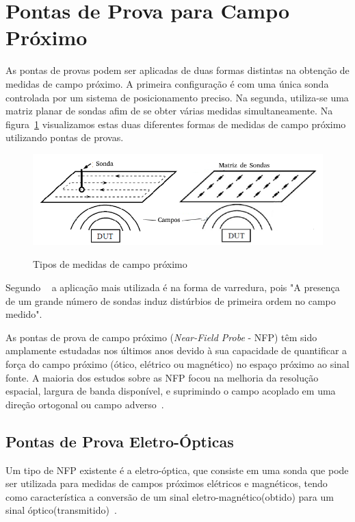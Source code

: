 \section{Pontas de Prova para Campo Próximo}
As pontas de provas podem ser aplicadas de duas formas distintas na obtenção de medidas de campo próximo. A primeira configuração é com uma única sonda controlada por um sistema de posicionamento preciso. Na segunda, utiliza-se uma matriz planar de sondas afim de se obter várias medidas simultaneamente. Na figura~\ref{fig:medidas_sondas} visualizamos estas duas diferentes formas de medidas de campo próximo utilizando pontas de provas.

\begin{figure}[htb!]
	\centering 
	\caption{Tipos de medidas de campo próximo}
	\includegraphics[scale=0.75]{./img/medidas_sondas}
	\label{fig:medidas_sondas}
\end{figure}

Segundo ~ a aplicação mais utilizada é na forma de varredura, pois "A presença de um grande número de sondas induz distúrbios de primeira ordem no campo medido".

As pontas de prova de campo próximo (\textit{Near-Field Probe} - NFP) têm sido amplamente estudadas nos últimos anos devido à sua capacidade de quantificar a força do campo próximo (ótico, elétrico ou magnético) no espaço próximo ao sinal fonte. A maioria dos estudos sobre as NFP focou na melhoria da resolução espacial, largura de banda disponível, e suprimindo o campo acoplado em uma direção ortogonal ou campo adverso~\cite[p.~21]{sivaraman2017}. 


\subsection{Pontas de Prova Eletro-Ópticas}
Um tipo de NFP existente é a eletro-óptica, que consiste em uma sonda que pode ser utilizada para medidas de campos próximos elétricos e magnéticos, tendo como característica a conversão de um sinal eletro-magnético(obtido) para um sinal óptico(transmitido)~\cite[p.~22]{sivaraman2017}.

